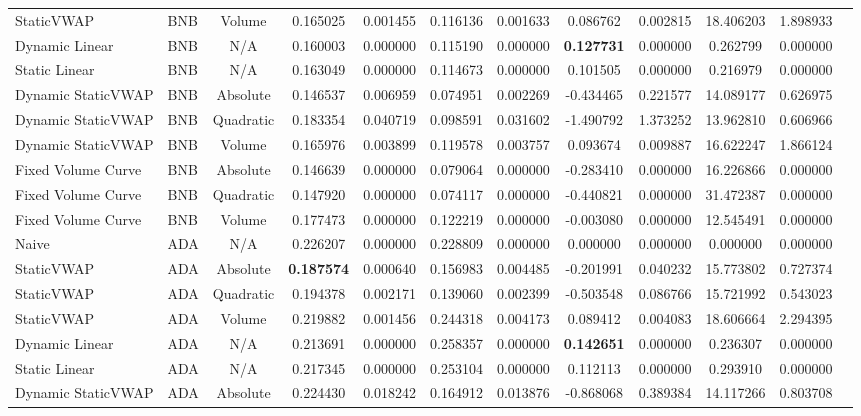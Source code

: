 \begin{table}[H]
{\begin{tabular}{llcccccccccc}
        StaticVWAP & BNB & Volume & 0.165025 & 0.001455 & 0.116136 & 0.001633 & 0.086762 & 0.002815 & 18.406203 & 1.898933 \\
        Dynamic Linear & BNB & N/A & 0.160003 & 0.000000 & 0.115190 & 0.000000 & \textbf{0.127731} & 0.000000 & 0.262799 & 0.000000 \\
        Static Linear & BNB & N/A & 0.163049 & 0.000000 & 0.114673 & 0.000000 & 0.101505 & 0.000000 & 0.216979 & 0.000000 \\
        Dynamic StaticVWAP & BNB & Absolute & 0.146537 & 0.006959 & 0.074951 & 0.002269 & -0.434465 & 0.221577 & 14.089177 & 0.626975 \\
        Dynamic StaticVWAP & BNB & Quadratic & 0.183354 & 0.040719 & 0.098591 & 0.031602 & -1.490792 & 1.373252 & 13.962810 & 0.606966 \\
        Dynamic StaticVWAP & BNB & Volume & 0.165976 & 0.003899 & 0.119578 & 0.003757 & 0.093674 & 0.009887 & 16.622247 & 1.866124 \\
        Fixed Volume Curve & BNB & Absolute & 0.146639 & 0.000000 & 0.079064 & 0.000000 & -0.283410 & 0.000000 & 16.226866 & 0.000000 \\
        Fixed Volume Curve & BNB & Quadratic & 0.147920 & 0.000000 & 0.074117 & 0.000000 & -0.440821 & 0.000000 & 31.472387 & 0.000000 \\
        Fixed Volume Curve & BNB & Volume & 0.177473 & 0.000000 & 0.122219 & 0.000000 & -0.003080 & 0.000000 & 12.545491 & 0.000000 \\
        \hline
        Naive & ADA & N/A & 0.226207 & 0.000000 & 0.228809 & 0.000000 & 0.000000 & 0.000000 & 0.000000 & 0.000000 \\
        StaticVWAP & ADA & Absolute & \textbf{0.187574} & 0.000640 & 0.156983 & 0.004485 & -0.201991 & 0.040232 & 15.773802 & 0.727374 \\
        StaticVWAP & ADA & Quadratic & 0.194378 & 0.002171 & 0.139060 & 0.002399 & -0.503548 & 0.086766 & 15.721992 & 0.543023 \\
        StaticVWAP & ADA & Volume & 0.219882 & 0.001456 & 0.244318 & 0.004173 & 0.089412 & 0.004083 & 18.606664 & 2.294395 \\
        Dynamic Linear & ADA & N/A & 0.213691 & 0.000000 & 0.258357 & 0.000000 & \textbf{0.142651} & 0.000000 & 0.236307 & 0.000000 \\
        Static Linear & ADA & N/A & 0.217345 & 0.000000 & 0.253104 & 0.000000 & 0.112113 & 0.000000 & 0.293910 & 0.000000 \\
        Dynamic StaticVWAP & ADA & Absolute & 0.224430 & 0.018242 & 0.164912 & 0.013876 & -0.868068 & 0.389384 & 14.117266 & 0.803708 \\

\end{tabular}}
\end{table}
